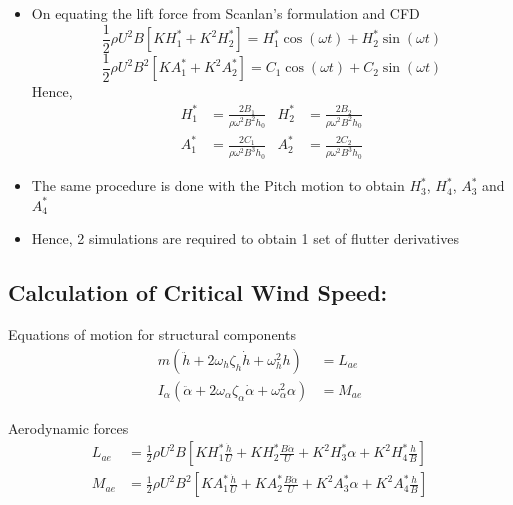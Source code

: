 \documentclass[a4paper, 12pt]{report}
\begin{document}
\begin{itemize}
    \setlength{\itemsep}{10pt}
    \item[$\bullet$] On equating the lift force from Scanlan's formulation and CFD
    \begin{equation}
        \frac{1}{2}\rho U^2 B \left[KH_1^* + K^2H_2^*\right] = H_1^* \cos(\omega t) + H_2^* \sin(\omega t)
    \end{equation}
    \begin{equation}
        \frac{1}{2}\rho U^2 B^2 \left[KA_1^* + K^2A_2^*\right] = C_1 \cos(\omega t) + C_2 \sin(\omega t)
    \end{equation}
    Hence,
    \begin{align}
        H_1^* &= \frac{2B_1}{\rho \omega^2 B^2 h_0} & H_2^* &= \frac{2B_2}{\rho \omega^2 B^2 h_0} \\
        A_1^* &= \frac{2C_1}{\rho \omega^2 B^3 h_0} & A_2^* &= \frac{2C_2}{\rho \omega^2 B^3 h_0}
    \end{align}

    \item[$\bullet$] The same procedure is done with the Pitch motion to obtain $H_3^*$, $H_4^*$, $A_3^*$ and $A_4^*$

    \item[$\bullet$] Hence, 2 simulations are required to obtain 1 set of flutter derivatives
\end{itemize}

\vspace{0.5cm}

\subsection*{Calculation of Critical Wind Speed:}

Equations of motion for structural components
\begin{align}
    m(\ddot{h} + 2\omega_{h}\zeta_h \dot{h} + \omega_h^2 h)                   &= L_{ae} \\
    I_\alpha(\ddot{\alpha} + 2\omega_{\alpha}\zeta_{\alpha} \dot{\alpha} + \omega_{\alpha}^2 \alpha) &= M_{ae}
\end{align}

Aerodynamic forces
\begin{align}
    L_{ae} &= \frac{1}{2}\rho U^2 B \left[KH_1^* \frac{\dot{h}}{U} + KH_2^* \frac{B\dot{\alpha}}{U} + K^2H_3^* \alpha + K^2H_4^* \frac{h}{B}\right] \\
    M_{ae} &= \frac{1}{2}\rho U^2 B^2 \left[KA_1^* \frac{\dot{h}}{U} + KA_2^* \frac{B\dot{\alpha}}{U} + K^2A_3^* \alpha + K^2A_4^* \frac{h}{B}\right]
\end{align}
\end{document}
